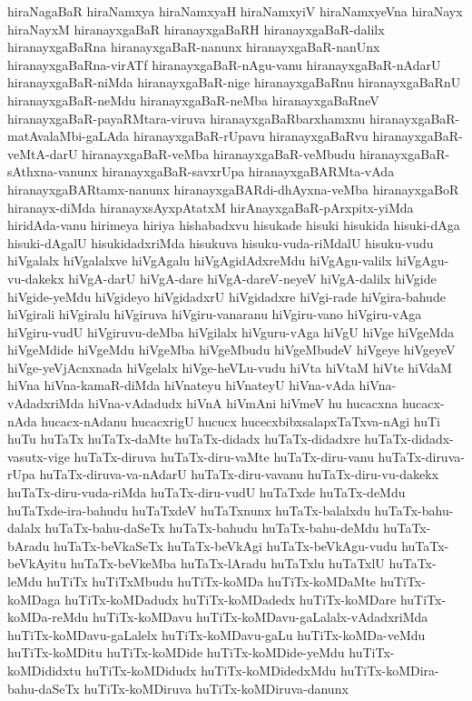 {hiraNagaBaR
hiraNamxya
hiraNamxyaH
hiraNamxyiV
hiraNamxyeVna
hiraNayx
hiraNayxM
hiranayxgaBaR
hiranayxgaBaRH
hiranayxgaBaR-dalilx
hiranayxgaBaRna
hiranayxgaBaR-nanunx
hiranayxgaBaR-nanUnx
hiranayxgaBaRna-virATf
hiranayxgaBaR-nAgu-vanu
hiranayxgaBaR-nAdarU
hiranayxgaBaR-niMda
hiranayxgaBaR-nige
hiranayxgaBaRnu
hiranayxgaBaRnU
hiranayxgaBaR-neMdu
hiranayxgaBaR-neMba
hiranayxgaBaRneV
hiranayxgaBaR-payaRMtara-viruva
hiranayxgaBaRbarxhamxnu
hiranayxgaBaR-matAvalaMbi-gaLAda
hiranayxgaBaR-rUpavu
hiranayxgaBaRvu
hiranayxgaBaR-veMtA-darU
hiranayxgaBaR-veMba
hiranayxgaBaR-veMbudu
hiranayxgaBaR-sAthxna-vanunx
hiranayxgaBaR-savxrUpa
hiranayxgaBARMta-vAda
hiranayxgaBARtamx-nanunx
hiranayxgaBARdi-dhAyxna-veMba
hiranayxgaBoR
hiranayx-diMda
hiranayxsAyxpAtatxM
hirAnayxgaBaR-pArxpitx-yiMda
hiridAda-vanu
hirimeya
hiriya
hishabadxvu
hisukade
hisuki
hisukida
hisuki-dAga
hisuki-dAgalU
hisukidadxriMda
hisukuva
hisuku-vuda-riMdalU
hisuku-vudu
hiVgalalx
hiVgalalxve
hiVgAgalu
hiVgAgidAdxreMdu
hiVgAgu-valilx
hiVgAgu-vu-dakekx
hiVgA-darU
hiVgA-dare
hiVgA-dareV-neyeV
hiVgA-dalilx
hiVgide
hiVgide-yeMdu
hiVgideyo
hiVgidadxrU
hiVgidadxre
hiVgi-rade
hiVgira-bahude
hiVgirali
hiVgiralu
hiVgiruva
hiVgiru-vanaranu
hiVgiru-vano
hiVgiru-vAga
hiVgiru-vudU
hiVgiruvu-deMba
hiVgilalx
hiVguru-vAga
hiVgU
hiVge
hiVgeMda
hiVgeMdide
hiVgeMdu
hiVgeMba
hiVgeMbudu
hiVgeMbudeV
hiVgeye
hiVgeyeV
hiVge-yeVjAcnxnada
hiVgelalx
hiVge-heVLu-vudu
hiVta
hiVtaM
hiVte
hiVdaM
hiVna
hiVna-kamaR-diMda
hiVnateyu
hiVnateyU
hiVna-vAda
hiVna-vAdadxriMda
hiVna-vAdadudx
hiVnA
hiVmAni
hiVmeV
hu
hucacxna
hucacx-nAda
hucacx-nAdanu
hucacxrigU
hucucx
hucecxbibxsalapxTaTxva-nAgi
huTi
huTu
huTaTx
huTaTx-daMte
huTaTx-didadx
huTaTx-didadxre
huTaTx-didadx-vasutx-vige
huTaTx-diruva
huTaTx-diru-vaMte
huTaTx-diru-vanu
huTaTx-diruva-rUpa
huTaTx-diruva-va-nAdarU
huTaTx-diru-vavanu
huTaTx-diru-vu-dakekx
huTaTx-diru-vuda-riMda
huTaTx-diru-vudU
huTaTxde
huTaTx-deMdu
huTaTxde-ira-bahudu
huTaTxdeV
huTaTxnunx
huTaTx-balalxdu
huTaTx-bahu-dalalx
huTaTx-bahu-daSeTx
huTaTx-bahudu
huTaTx-bahu-deMdu
huTaTx-bAradu
huTaTx-beVkaSeTx
huTaTx-beVkAgi
huTaTx-beVkAgu-vudu
huTaTx-beVkAyitu
huTaTx-beVkeMba
huTaTx-lAradu
huTaTxlu
huTaTxlU
huTaTx-leMdu
huTiTx
huTiTxMbudu
huTiTx-koMDa
huTiTx-koMDaMte
huTiTx-koMDaga
huTiTx-koMDadudx
huTiTx-koMDadedx
huTiTx-koMDare
huTiTx-koMDa-reMdu
huTiTx-koMDavu
huTiTx-koMDavu-gaLalalx-vAdadxriMda
huTiTx-koMDavu-gaLalelx
huTiTx-koMDavu-gaLu
huTiTx-koMDa-veMdu
huTiTx-koMDitu
huTiTx-koMDide
huTiTx-koMDide-yeMdu
huTiTx-koMDididxtu
huTiTx-koMDidudx
huTiTx-koMDidedxMdu
huTiTx-koMDira-bahu-daSeTx
huTiTx-koMDiruva
huTiTx-koMDiruva-danunx
}

